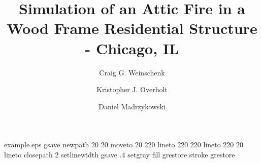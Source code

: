 %
%
%
%
%
\begin{filecontents*}{example.eps}
gsave
newpath
  20 20 moveto
  20 220 lineto
  220 220 lineto
  220 20 lineto
closepath
2 setlinewidth
gsave
  .4 setgray fill
grestore
stroke
grestore
\end{filecontents*}
%
\RequirePackage{fix-cm}
%
\documentclass[smallcondensed]{svjour3}     %
%
\smartqed  %


\renewcommand{\sb}[1]{_\mathrm{#1}}
\renewcommand{\C}{\mbox{C}}
\renewcommand{\H}{\mbox{H}}
\renewcommand{\O}{\mbox{O}}
\newcommand{\N}{\mbox{N}}

\usepackage{fancyhdr}
\pagestyle{fancy}
\lhead{}
\rhead{}
\chead{}
\renewcommand{\headrulewidth}{0pt}

%


\title{Simulation of an Attic Fire in a Wood Frame Residential Structure - Chicago, IL}


\author{Craig G. Weinschenk         \and
        Kristopher J. Overholt      \and
        Daniel Madrzykowski
}



